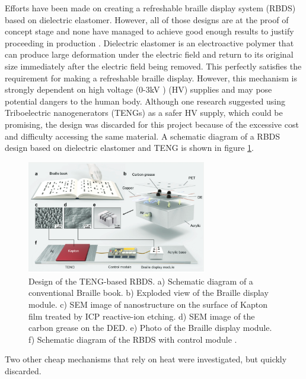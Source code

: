Efforts have been made on creating a refreshable braille display system (RBDS) based on dielectric elastomer. However, all of those designs are at the proof of concept stage and none have managed to achieve good enough results to justify proceeding in production \cite{qu_refreshable_2021}.
Dielectric elastomer is an electroactive polymer that can produce large deformation under the electric field and return to its original size immediately after the electric field being removed.
This perfectly satisfies the requirement for making a refreshable braille display. 
However, this mechanism is strongly dependent on high voltage (0-3kV \cite{qu_refreshable_2021}) (HV) supplies and may pose potential dangers to the human body.
Although one research suggested using Triboelectric nanogenerators (TENGs) as a safer HV supply, which could be promising, the design was discarded for this project because of the excessive cost and difficulty accessing the same material. 
A schematic diagram of a RBDS design based on dielectric elastomer and TENG is shown in figure \ref{fig:teng.png}.

\begin{figure}[h]\centering
    \includegraphics[width=0.7\textwidth]{figures/teng.png}
    \caption[Dielectric elastomer Braille display]{Design of the TENG-based RBDS. a) Schematic diagram of a conventional Braille book. b) Exploded view of the Braille display module. c) SEM image of nanostructure on the surface of Kapton film treated by ICP reactive-ion etching. d) SEM image of the carbon grease on the DED. e) Photo of the Braille display module. f) Schematic diagram of the RBDS with control module \cite{qu_refreshable_2021}.}
    \label{fig:teng.png}
\end{figure}

Two other cheap mechanisms that rely on heat were investigated, but quickly discarded.

